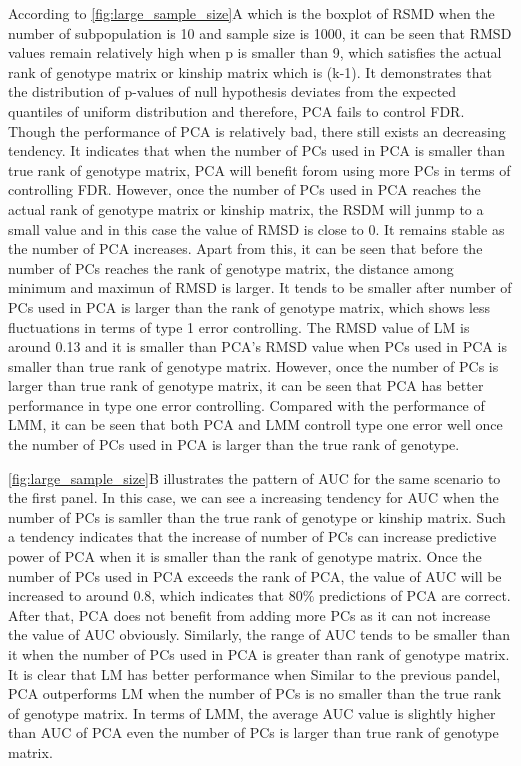 \documentclass[11pt]{article}
\begin{document}
According to \cref{fig:large_sample_size}A which is the boxplot of RSMD when the number of subpopulation is 10 and sample size is 1000, it can be seen that RMSD values remain relatively high when p is smaller than 9, which satisfies the actual rank of genotype matrix or kinship matrix which is (k-1).
It demonstrates that the distribution of p-values of null hypothesis deviates from the expected quantiles of uniform distribution and therefore, PCA fails to control FDR.
Though the performance of PCA is relatively bad, there still exists an decreasing tendency.
It indicates that when the number of PCs used in PCA is smaller than true rank of genotype matrix, PCA will benefit forom using more PCs in terms of controlling FDR.
However, once the number of PCs used in PCA reaches the actual rank of genotype matrix or kinship matrix, the RSDM will junmp to a small value and in this case the value of RMSD is close to 0.
It remains stable as the number of PCA increases.
Apart from this, it can be seen that before the number of PCs reaches the rank of genotype matrix, the distance among minimum and maximun of RMSD is larger.
It tends to be smaller after number of PCs used in PCA is larger than the rank of genotype matrix, which shows less fluctuations in terms of type 1 error controlling.
The RMSD value of LM is around 0.13 and it is smaller than PCA's RMSD value when PCs used in PCA is smaller than true rank of genotype matrix.
However, once the number of PCs is larger than true rank of genotype matrix, it can be seen that PCA has better performance in type one error controlling.
Compared with the performance of LMM, it can be seen that both PCA and LMM controll type one error well once the number of PCs used in PCA is larger than the true rank of genotype.

\cref{fig:large_sample_size}B illustrates the pattern of AUC for the same scenario to the first panel.
In this case, we can see a increasing tendency for AUC when the number of PCs is samller than the true rank of genotype or kinship matrix.
Such a tendency indicates that the increase of number of PCs can increase predictive power of PCA when it is smaller than the rank of genotype matrix.
Once the number of PCs used in PCA exceeds the rank of PCA, the value of AUC will be increased to around 0.8, which indicates that $80\%$ predictions of PCA are correct.
After that, PCA does not benefit from adding more PCs as it can not increase the value of AUC obviously.
Similarly, the range of AUC tends to be smaller than it when the number of PCs used in PCA is greater than rank of genotype matrix.
It is clear that LM has better performance when
Similar to the previous pandel, PCA outperforms LM when the number of PCs is no smaller than the true rank of genotype matrix.
In terms of LMM, the average AUC value is slightly higher than AUC of PCA even the number of PCs is larger than true rank of genotype matrix. 
\end{document}
